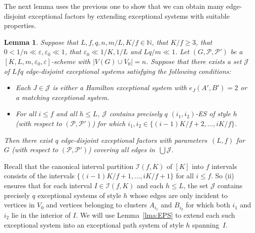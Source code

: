 \documentclass{memo-l}
\newtheorem{lemma}[firstthm]{Lemma}
\def\cP{\mathcal{P}}
\def\eps{\varepsilon}
\numberwithin{section}{chapter}
\numberwithin{equation}{section}
\numberwithin{firstthm}{section}
\numberwithin{figure}{section}
\begin{document}
The next lemma uses the previous one to show that we can obtain many edge-disjoint exceptional factors by extending exceptional systems with suitable properties.

\begin{lemma} \label{lma:EF}
Suppose that $L,f,q,n,m/L,K/f \in \mathbb{N}$, that $K/f\ge 3$, that $0 <1/n \ll \eps,\eps_0  \ll 1$,
that $\eps_0\ll 1/K,1/L$ and $Lq/m\ll 1$.
Let $(G,\mathcal{P}, \mathcal{P}')$ be a $[K, L, m,\eps_0,\eps]$-scheme with $|V(G)\cup V_0|=n$.
Suppose that there exists a set $\mathcal{J}$ of $Lf q $ edge-disjoint exceptional systems
satisfying the following conditions: 
\begin{itemize}
    \item[{\rm (i)}] Each $J\in \mathcal{J}$ is either a Hamilton exceptional system with $e_J(A',B')=2$ or
     a matching exceptional system. 
	\item[{\rm (ii)}] For all $i \le f$ and all $h \le L$, $\mathcal{J}$ contains precisely $q$ $(i_1,i_2)$-ES of style $h$
(with respect to $(\cP,\cP')$) for which $i_1,i_2 \in \{ (i-1)K/f+2, \dots, iK/f \}$.
\end{itemize}
Then there exist $q$ edge-disjoint exceptional factors with parameters~$(L,f)$ for $G$ (with respect to  $(\cP,\cP')$)
covering all edges in~$\bigcup\mathcal{J}$.
\end{lemma}

Recall that the canonical interval partition $\mathcal{I}(f,K)$ of $[K]$ into $f$ intervals consists of the intervals
$\{ (i-1)K/f+1, \dots, iK/f +1\}$ for all $i\le f$. So (ii) ensures
that for each interval $I\in \mathcal{I}(f,K)$ and each $h\le L$, the set $\mathcal{J}$ contains precisely $q$ exceptional systems of style $h$
whose edges are only incident to vertices in $V_0$ and vertices
belonging to clusters $A_{i_1}$ and $B_{i_2}$ for which both $i_1$ and $i_2$ lie in the interior of $I$.
We will use Lemma~\ref{lma:EPS} to extend each such exceptional system into an exceptional path system of style $h$ spanning~$I$.
\end{document}

